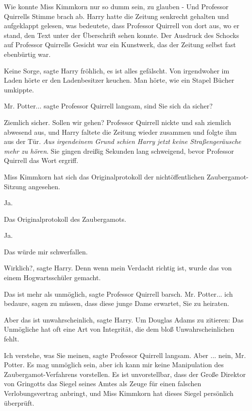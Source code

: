 \glqq{}Wie konnte Miss Kimmkorn nur so dumm sein, zu glauben -\grqq{} Und
Professor Quirrells Stimme brach ab. Harry hatte die Zeitung senkrecht gehalten
und aufgeklappt gelesen, was bedeutete, dass Professor Quirrell von dort aus, wo
er stand, den Text unter der Überschrift sehen konnte. Der Ausdruck des Schocks
auf Professor Quirrells Gesicht war ein Kunstwerk, das der Zeitung selbst fast
ebenbürtig war.

\glqq{}Keine Sorge\grqq{}, sagte Harry fröhlich, \glqq{}es ist alles
gefälscht.\grqq{} Von irgendwoher im Laden hörte er den Ladenbesitzer keuchen.
Man hörte, wie ein Stapel Bücher umkippte.

\glqq{}Mr. Potter...\grqq{} sagte Professor Quirrell langsam, \glqq{}sind Sie sich
da sicher?\grqq{}

\glqq{}Ziemlich sicher. Sollen wir gehen?\grqq{} Professor Quirrell nickte und
sah ziemlich abwesend aus, und Harry faltete die Zeitung wieder zusammen und
folgte ihm aus der Tür. \emph{Aus irgendeinem Grund schien Harry jetzt keine
Straßengeräusche mehr zu hören}. Sie gingen dreißig Sekunden lang schweigend,
bevor Professor Quirrell das Wort ergriff.

\glqq{}Miss Kimmkorn hat sich das Originalprotokoll der nichtöffentlichen
Zaubergamot-Sitzung angesehen.\grqq{}

\glqq{}Ja.\grqq{}

\glqq{}Das Originalprotokoll des Zaubergamots.\grqq{}

\glqq{}Ja.\grqq{}

\glqq{}Das würde mir schwerfallen.\grqq{}

\glqq{}Wirklich?\grqq{}, sagte Harry. \glqq{}Denn wenn mein Verdacht richtig ist,
wurde das von einem Hogwartsschüler gemacht.\grqq{}

\glqq{}Das ist mehr als unmöglich\grqq{}, sagte Professor Quirrell barsch. \glqq
Mr. Potter... ich bedaure, sagen zu müssen, dass diese junge Dame erwartet, Sie
zu heiraten.\grqq{}

\glqq{}Aber das ist unwahrscheinlich\grqq{}, sagte Harry. \glqq{}Um Douglas Adams
zu zitieren: Das Unmögliche hat oft eine Art von Integrität, die dem bloß
Unwahrscheinlichen fehlt.\grqq{}

\glqq{}Ich verstehe, was Sie meinen\grqq{}, sagte Professor Quirrell langsam.
\glqq{}Aber ... nein, Mr. Potter. Es mag unmöglich sein, aber ich kann mir keine
Manipulation des Zaubergamot-Verfahrens vorstellen. Es ist unvorstellbar, dass
der Große Direktor von Gringotts das Siegel seines Amtes als Zeuge für einen
falschen Verlobungsvertrag anbringt, und Miss Kimmkorn hat dieses Siegel
persönlich überprüft.\grqq{}


